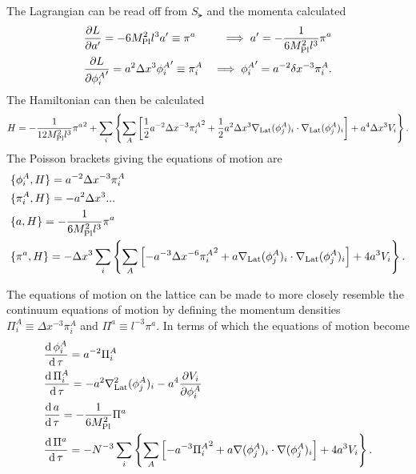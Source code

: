 The Lagrangian can be read off from $S_\lat$ and the momenta calculated
\begin{align}
  & \frac{\partial L}{\partial a'} = -6M_{\mathrm{Pl}}^2l^3a' \equiv \pi^a
  & \implies a'=-\frac{1}{6M_{\mathrm{Pl}}^2l^3}\pi^a \\
  & \frac{\partial L}{\partial {\phi^A_i}'} = a^2\Delta x^3{\phi^A_i}' \equiv \pi^A_i
  & \implies {\phi^A_i}' = a^{-2}\delta x^{-3}\pi^A_i.
\end{align}
The Hamiltonian can then be calculated
\begin{equation} \label{eq:lat ham}
  H = -\frac{1}{12M_{\mathrm{Pl}}^2l^3}{\pi^a}^2
  + \sum_i \left\{ \sum_A \left[
      \frac{1}{2}a^{-2}\Delta x^{-3}{\pi^A_i}^2
      + \frac{1}{2}a^2\Delta x^3\nabla_{\mathrm{Lat}}(\phi^A_j)_i\cdot\nabla_{\mathrm{Lat}}(\phi^A_j)_i  \right]
    + a^4\Delta x^3V_i\right\}.
\end{equation}
The Poisson brackets giving the equations of motion are
\begin{align}
  & \{\phi^A_i,H\} = a^{-2}\Delta x^{-3}\pi^A_i \\
  & \{\pi^A_i,H\} = -a^2\Delta x^3 ... \\
  & \{a,H\} = -\frac{1}{6M_{\mathrm{Pl}}^2l^3}\pi^a \\
  & \{\pi^a,H\} = -\Delta x^3\sum_i\left\{\sum_A\left[ -a^{-3}\Delta x^{-6}{\pi^A_i}^2 + a\nabla_{\mathrm{Lat}}(\phi^A_j)_i\cdot\nabla_{\mathrm{Lat}}(\phi^A_j)_i\right] + 4a^3V_i \right\}.
\end{align}

The equations of motion on the lattice can be made to more closely resemble the continuum equations of motion by defining the momentum densities
$\Pi^A_i \equiv \Delta x^{-3}\pi^A_i$ and $\Pi^a \equiv l^{-3}\pi^a$.
In terms of which the equations of motion become
\begin{align} %
  & \frac{\dd\phi^A_i}{\dd\tau} = a^{-2}\Pi^A_i\\
  & \frac{\dd\Pi^A_i}{\dd\tau} = -a^2\nabla^2_\lat(\phi^A_j)_i -a^4\frac{\partial V_i}{\partial \phi^A_i}\\
  & \frac{\dd a}{\dd\tau} = -\frac{1}{6\mpl^2}\Pi^a\\
  & \frac{\dd\Pi^a}{\dd\tau} = -N^{-3}\sum_i\left\{
  \sum_A\left[-a^{-3}{\Pi^A_i}^2 + a\nabla(\phi^A_j)_i\cdot\nabla(\phi^A_j)_i \right]
  + 4a^3V_i\right\}.
\end{align}

